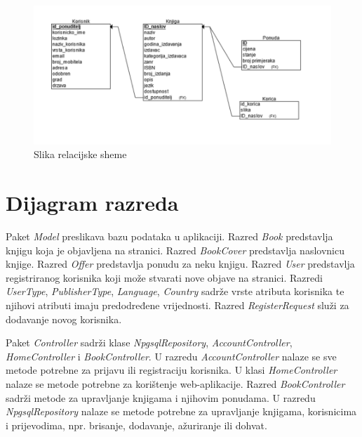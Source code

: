 		\begin{figure}[hbt!]
			\centering
			\includegraphics[width = \textwidth]{slike/Relacijska shema}
			\caption{Slika relacijske sheme}
			\label{fig:enter-label}
		\end{figure}
		
		\eject
			
		\section{Dijagram razreda}
		
			Paket \textit{Model} preslikava bazu podataka u aplikaciji. Razred \textit{Book} predstavlja knjigu koja je objavljena na stranici. Razred \textit{BookCover} predstavlja naslovnicu knjige. Razred \textit{Offer} predstavlja ponudu za neku knjigu. Razred \textit{User} predstavlja registriranog korisnika koji može stvarati nove objave na stranici. Razredi \textit{UserType}, \textit{PublisherType}, \textit{Language}, \textit{Country} sadrže vrste atributa korisnika te njihovi atributi imaju predodređene vrijednosti. Razred \textit{RegisterRequest} služi za dodavanje novog korisnika.
				
			Paket \textit{Controller} sadrži klase \textit{NpgsqlRepository}, \textit{AccountController}, \textit{HomeController} i \textit{BookController}. U razredu \textit{AccountController} nalaze se sve metode potrebne za prijavu ili registraciju korisnika. U klasi \textit{HomeController} nalaze se metode potrebne za korištenje web-aplikacije. Razred \textit{BookController} sadrži metode za upravljanje knjigama i njihovim ponudama. U razredu \textit{NpgsqlRepository} nalaze se metode potrebne za upravljanje knjigama, korisnicima i prijevodima, npr. brisanje, dodavanje, ažuriranje ili dohvat.\\
			
			\clearpage
			
